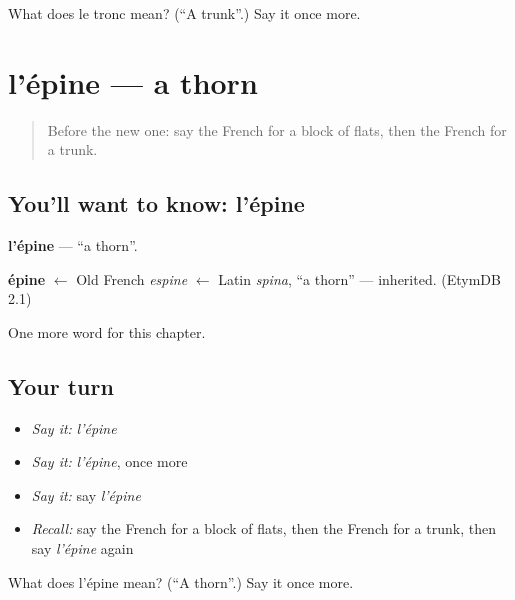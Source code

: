 \begin{tcolorbox}[breakable,colback=teal!4,colframe=teal!35!black,title={Before you move on}]
What does le tronc mean? (\textquotedblleft{}A trunk\textquotedblright{}.) Say it once more.
\end{tcolorbox}
\section[l'épine]{l'épine — a thorn}

\label{lesson:FR-C254-epine}



\begin{quote}
Before the new one: say the French for a block of flats, then the French for a trunk.
\end{quote}

\subsection*{You'll want to know: l'épine}
\textbf{l'épine} — \textquotedblleft{}a thorn\textquotedblright{}.

\begin{cousinweb}
\textbf{épine} $\leftarrow$ Old French \emph{espine} $\leftarrow$ Latin \emph{spina}, \textquotedblleft{}a thorn\textquotedblright{} — inherited. (EtymDB 2.1)
\end{cousinweb}

\begin{grammarlens}[title={What you've built}]
One more word for this chapter.
\end{grammarlens}

\subsection*{Your turn}
\begin{itemize}
\raggedright
  \item \emph{Say it:} \emph{l'épine}
  \item \emph{Say it:} \emph{l'épine}, once more
  \item \emph{Say it:} say \emph{l'épine}
  \item \emph{Recall:} say the French for a block of flats, then the French for a trunk, then say \emph{l'épine} again
\end{itemize}

\begin{tcolorbox}[breakable,colback=teal!4,colframe=teal!35!black,title={Before you move on}]
What does l'épine mean? (\textquotedblleft{}A thorn\textquotedblright{}.) Say it once more.
\end{tcolorbox}
